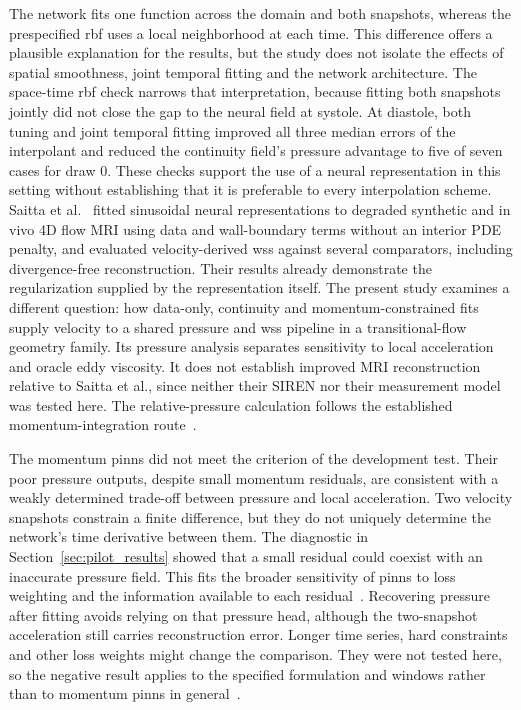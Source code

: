 \documentclass[12pt,a4paper]{article}
\newcommand{\PINNs}{\acp{pinn}\xspace}
\newcommand{\WSS}{\ac{wss}\xspace}
\newcommand{\RBF}{\ac{rbf}\xspace}
\theoremstyle{definition}
\numberwithin{equation}{section}
\begin{document}
The network fits one function across the domain and both snapshots, whereas the prespecified \RBF uses a local neighborhood at each time. This difference offers a plausible explanation for the results, but the study does not isolate the effects of spatial smoothness, joint temporal fitting and the network architecture. The space-time \RBF check narrows that interpretation, because fitting both snapshots jointly did not close the gap to the neural field at systole. At diastole, both tuning and joint temporal fitting improved all three median errors of the interpolant and reduced the continuity field's pressure advantage to five of seven cases for draw 0. These checks support the use of a neural representation in this setting without establishing that it is preferable to every interpolation scheme. Saitta et al.~\cite{saitta2024implicit} fitted sinusoidal neural representations to degraded synthetic and in vivo 4D flow MRI using data and wall-boundary terms without an interior PDE penalty, and evaluated velocity-derived \WSS against several comparators, including divergence-free reconstruction. Their results already demonstrate the regularization supplied by the representation itself. The present study examines a different question: how data-only, continuity and momentum-constrained fits supply velocity to a shared pressure and \WSS pipeline in a transitional-flow geometry family. Its pressure analysis separates sensitivity to local acceleration and oracle eddy viscosity. It does not establish improved MRI reconstruction relative to Saitta et al., since neither their SIREN nor their measurement model was tested here. The relative-pressure calculation follows the established momentum-integration route~\cite{krittian2012finite,bertoglio2018relative}.

The momentum \PINNs did not meet the criterion of the development test. Their poor pressure outputs, despite small momentum residuals, are consistent with a weakly determined trade-off between pressure and local acceleration. Two velocity snapshots constrain a finite difference, but they do not uniquely determine the network's time derivative between them. The diagnostic in Section~\ref{sec:pilot_results} showed that a small residual could coexist with an inaccurate pressure field. This fits the broader sensitivity of \PINNs to loss weighting and the information available to each residual~\cite{krishnapriyan2021failure,wang2021gradient}. Recovering pressure after fitting avoids relying on that pressure head, although the two-snapshot acceleration still carries reconstruction error. Longer time series, hard constraints and other loss weights might change the comparison. They were not tested here, so the negative result applies to the specified formulation and windows rather than to momentum \PINNs in general~\cite{mcgreivy2024weak}.
\end{document}
